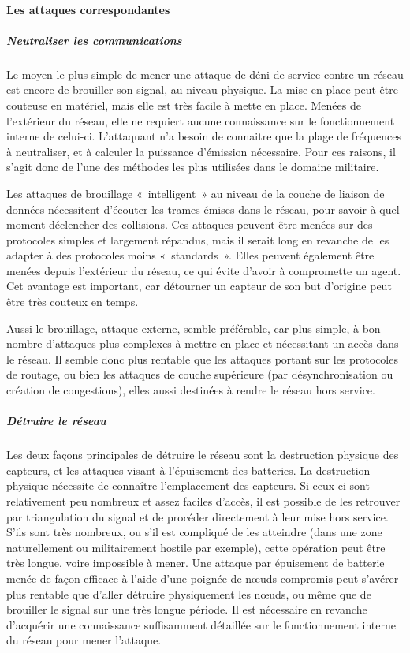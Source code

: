         \paragraph{Les attaques correspondantes}
            \subparagraph{Neutraliser les communications}
Le moyen le plus simple de mener une attaque de déni de service contre un réseau est encore de brouiller son signal, au niveau physique.
La mise en place peut être couteuse en matériel, mais elle est très facile à mette en place.
Menées de l'extérieur du réseau, elle ne requiert aucune connaissance sur le fonctionnement interne de celui-ci.
L'attaquant n'a besoin de connaitre que la plage de fréquences à neutraliser, et à calculer la puissance d'émission nécessaire.
Pour ces raisons, il s'agit donc de l'une des méthodes les plus utilisées dans le domaine militaire.

Les attaques de brouillage « intelligent » au niveau de la couche de liaison de données nécessitent d'écouter les trames émises dans le réseau, pour savoir à quel moment déclencher des collisions.
Ces attaques peuvent être menées sur des protocoles simples et largement répandus, mais il serait long en revanche de les adapter à des protocoles moins « standards ».
Elles peuvent également être menées depuis l'extérieur du réseau, ce qui évite d'avoir à compromette un agent.
Cet avantage est important, car détourner un capteur de son but d'origine peut être très couteux en temps.

Aussi le brouillage, attaque externe, semble préférable, car plus simple, à bon nombre d'attaques plus complexes à mettre en place et nécessitant un accès dans le réseau.
Il semble donc plus rentable que les attaques portant sur les protocoles de routage, ou bien les attaques de couche supérieure (par désynchronisation ou création de congestions), elles aussi destinées à rendre le réseau hors service.

            \subparagraph{Détruire le réseau}
Les deux façons principales de détruire le réseau sont la destruction physique des capteurs, et les attaques visant à l'épuisement des batteries.
La destruction physique nécessite de connaître l'emplacement des capteurs.
Si ceux-ci sont relativement peu nombreux et assez faciles d'accès, il est possible de les retrouver par triangulation du signal et de procéder directement à leur mise hors service.
S'ils sont très nombreux, ou s'il est compliqué de les atteindre (dans une zone naturellement ou militairement hostile par exemple), cette opération peut être très longue, voire impossible à mener.
Une attaque par épuisement de batterie menée de façon efficace à l'aide d'une poignée de nœuds compromis peut s'avérer plus rentable que d'aller détruire physiquement les nœuds, ou même que de brouiller le signal sur une très longue période.
Il est nécessaire en revanche d'acquérir une connaissance suffisamment détaillée sur le fonctionnement interne du réseau pour mener l'attaque.


